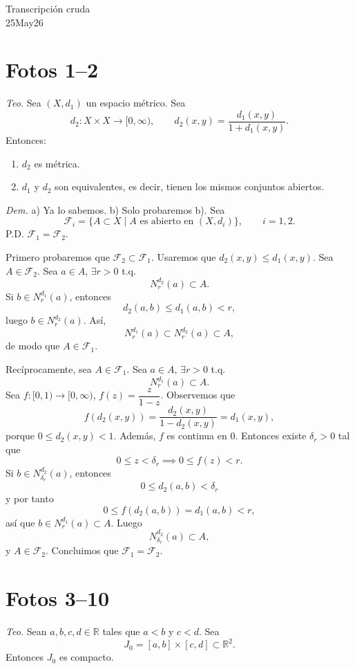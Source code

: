 \documentclass[12pt]{article}
\begin{document}
\begin{center}
{\Large Transcripción cruda}\\[2mm]
{\large 25May26}
\end{center}

\section*{Fotos 1--2}

\textit{Teo.} Sea $(X,d_1)$ un espacio métrico. Sea
\[
d_2:X\times X\to[0,\infty),\qquad d_2(x,y)=\frac{d_1(x,y)}{1+d_1(x,y)}.
\]
Entonces:
\begin{enumerate}[label=\alph*)]
    \item $d_2$ es métrica.
    \item $d_1$ y $d_2$ son equivalentes, es decir, tienen los mismos conjuntos abiertos.
\end{enumerate}

\textit{Dem.} a) Ya lo sabemos. b) Solo probaremos b).
Sea
\[
\mathcal F_i=\{A\subset X\mid A \text{ es abierto en }(X,d_i)\},\qquad i=1,2.
\]
P.D. $\mathcal F_1=\mathcal F_2$.

Primero probaremos que $\mathcal F_2\subset \mathcal F_1$.
Usaremos que $d_2(x,y)\le d_1(x,y)$.
Sea $A\in\mathcal F_2$. Sea $a\in A$, $\exists r>0$ t.q.
\[
N_r^{d_2}(a)\subset A.
\]
Si $b\in N_r^{d_1}(a)$, entonces
\[
d_2(a,b)\le d_1(a,b)<r,
\]
luego $b\in N_r^{d_2}(a)$.
Así,
\[
N_r^{d_1}(a)\subset N_r^{d_2}(a)\subset A,
\]
de modo que $A\in\mathcal F_1$.

Recíprocamente, sea $A\in\mathcal F_1$.
Sea $a\in A$, $\exists r>0$ t.q.
\[
N_r^{d_1}(a)\subset A.
\]
Sea $f:[0,1)\to[0,\infty)$, $f(z)=\dfrac{z}{1-z}$.
Observemos que
\[
f(d_2(x,y))=\frac{d_2(x,y)}{1-d_2(x,y)}=d_1(x,y),
\]
porque $0\le d_2(x,y)<1$.
Además, $f$ es continua en $0$.
Entonces existe $\delta_r>0$ tal que
\[
0\le z<\delta_r \implies 0\le f(z)<r.
\]
Si $b\in N_{\delta_r}^{d_2}(a)$, entonces
\[
0\le d_2(a,b)<\delta_r
\]
y por tanto
\[
0\le f(d_2(a,b))=d_1(a,b)<r,
\]
así que $b\in N_r^{d_1}(a)\subset A$.
Luego
\[
N_{\delta_r}^{d_2}(a)\subset A,
\]
y $A\in\mathcal F_2$.
Concluimos que $\mathcal F_1=\mathcal F_2$.

\section*{Fotos 3--10}

\textit{Teo.} Sean $a,b,c,d\in\mathbb R$ tales que $a<b$ y $c<d$.
Sea
\[
J_0=[a,b]\times[c,d]\subset\mathbb R^2.
\]
Entonces $J_0$ es compacto.
\end{document}
